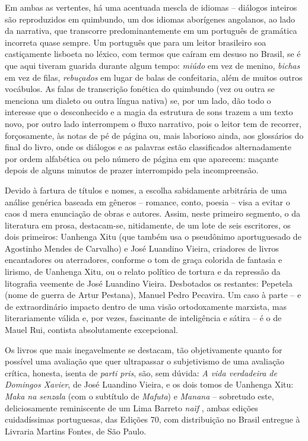 \documentclass[
  letterpaper,
  DIV=11,
  numbers=noendperiod]{scrreprt}
\begin{document}
Em ambas as vertentes, há uma acentuada mescla de idiomas -- diálogos
inteiros são reproduzidos em quimbundo, um dos idiomas aborígenes
angolanos, ao lado da narrativa, que transcorre predominantemente em um
português de gramática incorreta quase sempre. Um português que para um
leitor brasileiro soa castiçamente lisboeta no léxico, com termos que
caíram em desuso no Brasil, se é que aqui tiveram guarida durante algum
tempo: \emph{miúdo} em vez de menino, \emph{bichas} em vez de filas,
\emph{rebuçados} em lugar de balas de confeitaria, além de muitos outros
vocábulos. As falas de transcrição fonética do quimbundo (vez ou outra
se menciona um dialeto ou outra língua nativa) se, por um lado, dão todo
o interesse que o desconhecido e a magia da estrutura de sons trazem a
um texto novo, por outro lado interrompem o fluxo narrativo, pois o
leitor tem de recorrer, forçosamente, às notas de pé de página ou, mais
laborioso ainda, aos glossários do final do livro, onde os diálogos e as
palavras estão classificados alternadamente por ordem alfabética ou pelo
número de página em que aparecem: maçante depois de alguns minutos de
prazer interrompido pela incompreensão.

Devido à fartura de títulos e nomes, a escolha sabidamente arbitrária de
uma análise genérica baseada em gêneros -- romance, conto, poesia --
visa a evitar o caos d mera enunciação de obras e autores. Assim, neste
primeiro segmento, o da literatura em prosa, destacam-se, nitidamente,
de um lote de seis escritores, os dois primeiros: Uanhenga Xitu (que
também usa o pseudônimo aportuguesado de Agostinho Mendes de Carvalho) e
José Luandino Vieira, criadores de livros encantadores ou aterradores,
conforme o tom de graça colorida de fantasia e lirismo, de Uanhenga
Xitu, ou o relato político de tortura e da repressão da litografia
veemente de José Luandino Vieira. Desbotados os restantes: Pepetela
(nome de guerra de Artur Pestana), Manuel Pedro Pecavira. Um caso à
parte -- e de extraordinário impacto dentro de uma visão ortodoxamente
marxista, mas literariamente válida e, por vezes, fascinante de
inteligência e sátira -- é o de Mauel Rui, contista absolutamente
excepcional.

Os livros que mais inegavelmente se destacam, tão objetivamente quanto
for possível uma avaliação que quer ultrapassar o subjetivismo de uma
avaliação crítica, honesta, isenta de \emph{parti pris}, são, sem
dúvida: \emph{A vida verdadeira de Domingos Xavier}, de José Luandino
Vieira, e os dois tomos de Uanhenga Xitu: \emph{Maka na senzala} (com o
subtítulo de \emph{Mafuta}) e \emph{Manana} -- sobretudo este,
deliciosamente reminiscente de um Lima Barreto \emph{naïf} , ambas
edições cuidadíssimas portuguesas, das Edições 70, com distribuição no
Brasil entregue à Livraria Martins Fontes, de São Paulo.
\end{document}
